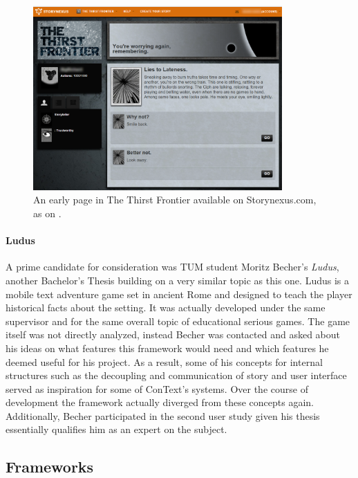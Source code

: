 \begin{figure}[!h]
\centering
\includegraphics[width=0.85\textwidth]{figures/storynexus.png}
\caption[Storynexus.com; The Thirst Frontier]{An early page in The Thirst Frontier available on Storynexus.com, as on \cite{SNEXTTF}.}\label{fig:storynexus}
\end{figure}

\paragraph{Ludus} 
A prime candidate for consideration was TUM student Moritz Becher's \textit{Ludus}, another Bachelor's Thesis building on a very similar topic as this one. Ludus is a mobile text adventure game set in ancient Rome and designed to teach the player historical facts about the setting. It was actually developed under the same supervisor and for the same overall topic of educational serious games. The game itself was not directly analyzed, instead Becher was contacted and asked about his ideas on what features this framework would need and which features he deemed useful for his project. As a result, some of his concepts for internal structures such as the decoupling and communication of story and user interface served as inspiration for some of ConText's systems. Over the course of development the framework actually diverged from these concepts again. Additionally, Becher participated in the second user study given his thesis essentially qualifies him as an expert on the subject. \cite{LUDUS}

\subsection{Frameworks}
